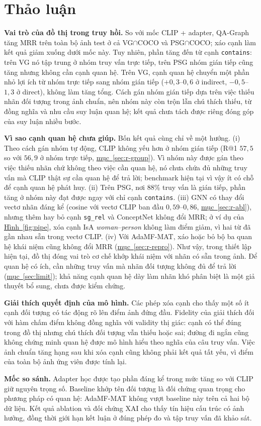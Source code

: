 \section{Thảo luận}\label{sec:disc}
\textbf{Vai trò của đồ thị trong truy hồi.} So với mốc CLIP + adapter, QA-Graph tăng MRR trên toàn bộ ảnh test ở cả VG$\cap$COCO và PSG$\cap$COCO; xáo cạnh làm kết quả giảm xuống dưới mốc này. Tuy nhiên, phần tăng đến từ cạnh \texttt{contains}: trên VG nó tập trung ở nhóm truy vấn trực tiếp, trên PSG nhóm gián tiếp cũng tăng nhưng không cần cạnh quan hệ. Trên VG, cạnh quan hệ chuyển một phần nhỏ lợi ích từ nhóm trực tiếp sang nhóm gián tiếp ($+0{,}3$--$0{,}6$ ở indirect, $-0{,}5$--$1{,}3$ ở direct), không làm tăng tổng. Cách gán nhóm gián tiếp dựa trên việc thiếu nhãn đối tượng trong ảnh chuẩn, nên nhóm này còn trộn lẫn chú thích thiếu, từ đồng nghĩa và nhu cầu suy luận quan hệ; kết quả chưa tách được riêng đóng góp của suy luận nhiều bước.

\textbf{Vì sao cạnh quan hệ chưa giúp.} Bốn kết quả cùng chỉ về một hướng. (i) Theo cách gán nhóm tự động, CLIP không yếu hơn ở nhóm gián tiếp (R@1 $57{,}5$ so với $56{,}9$ ở nhóm trực tiếp, \hyperref[sec:r-group]{mục~\ref*{sec:r-group}}). Vì nhóm này được gán theo việc thiếu nhãn chứ không theo việc cần quan hệ, nó chưa chứa đủ những truy vấn mà CLIP thật sự cần quan hệ để trả lời; benchmark hiện tại vì vậy ít có chỗ để cạnh quan hệ phát huy. (ii) Trên PSG, nơi 88\% truy vấn là gián tiếp, phần tăng ở nhóm này đạt được ngay với chỉ cạnh \texttt{contains}. (iii) GNN có thay đổi vectơ nhãn đáng kể (cosine với vectơ CLIP ban đầu $0{,}59$--$0{,}86$, \hyperref[sec:r-abl]{mục~\ref*{sec:r-abl}}), nhưng thêm hay bỏ cạnh \texttt{sg\_rel} và ConceptNet không đổi MRR; ở ví dụ của \hyperref[fig:pipe]{Hình~\ref*{fig:pipe}}, xóa cạnh IsA \emph{woman}--\emph{person} không làm điểm giảm, vì hai từ đã gần nhau sẵn trong vectơ CLIP. (iv) Với AdaMF-MAT, xáo hoặc bỏ bộ ba quan hệ khái niệm cũng không đổi MRR (\hyperref[sec:r-repro]{mục~\ref*{sec:r-repro}}). Như vậy, trong thiết lập hiện tại, đồ thị đóng vai trò cơ chế khớp khái niệm với nhãn có sẵn trong ảnh. Để quan hệ có ích, cần những truy vấn mà nhãn đối tượng không đủ để trả lời (\hyperref[sec:limit]{mục~\ref*{sec:limit}}); khả năng cạnh quan hệ dày làm nhãn khó phân biệt là một giả thuyết bổ sung, chưa được kiểm chứng.

\textbf{Giải thích quyết định của mô hình.} Các phép xóa cạnh cho thấy một số ít cạnh đối tượng có tác động rõ lên điểm ảnh đứng đầu. Fidelity của giải thích đối với hàm chấm điểm không đồng nghĩa với validity thị giác: cạnh có thể đúng trong đồ thị nhưng chú thích đối tượng vẫn thiếu hoặc sai; đường đi ngắn cũng không chứng minh quan hệ được mô hình hiểu theo nghĩa của câu truy vấn. Việc ảnh chuẩn tăng hạng sau khi xóa cạnh cũng không phải kết quả tất yếu, vì điểm của toàn bộ ảnh ứng viên được tính lại.

\textbf{Mốc so sánh.} Adapter học được tạo phần đáng kể trong mức tăng so với CLIP giữ nguyên trọng số. Baseline khớp tên đối tượng là đối chứng quan trọng cho phương pháp có quan hệ: AdaMF-MAT không vượt baseline này trên cả hai bộ dữ liệu. Kết quả ablation và đối chứng XAI cho thấy tín hiệu cấu trúc có ảnh hưởng, đồng thời giới hạn kết luận ở đúng phép đo và tập truy vấn đã khảo sát.
